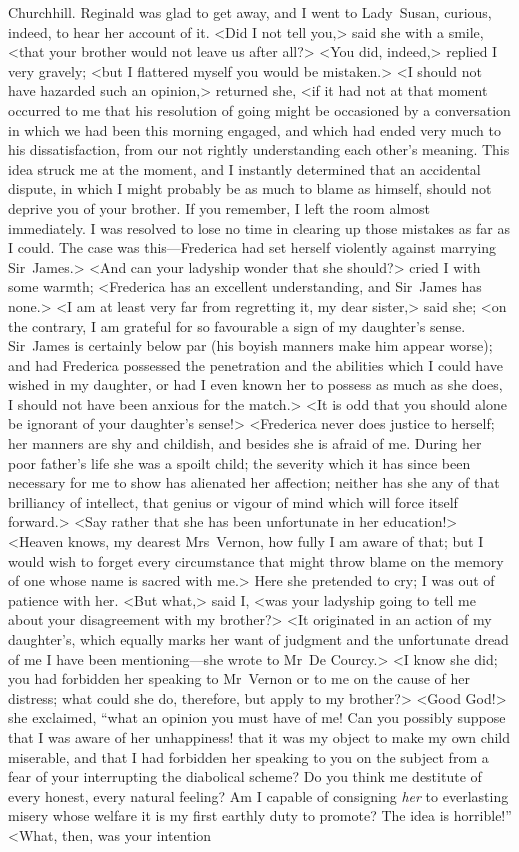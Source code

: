 \begin{mail}{Churchhill.}{}
Reginald was glad to get away, and I went to Lady~Susan, curious, indeed, to hear her account of it. <Did I not tell you,> said she with a smile, <that your brother would not leave us after all?> <You did, indeed,> replied I very gravely; <but I flattered myself you would be mistaken.> <I should not have hazarded such an opinion,> returned she, <if it had not at that moment occurred to me that his resolution of going might be occasioned by a conversation in which we had been this morning engaged, and which had ended very much to his dissatisfaction, from our not rightly understanding each other's meaning. This idea struck me at the moment, and I instantly determined that an accidental dispute, in which I might probably be as much to blame as himself, should not deprive you of your brother. If you remember, I left the room almost immediately. I was resolved to lose no time in clearing up those mistakes as far as I could. The case was this—Frederica had set herself violently against marrying Sir~James.> <And can your ladyship wonder that she should?> cried I with some warmth; <Frederica has an excellent understanding, and Sir~James has none.> <I am at least very far from regretting it, my dear sister,> said she; <on the contrary, I am grateful for so favourable a sign of my daughter's sense. Sir~James is certainly below par (his boyish manners make him appear worse); and had Frederica possessed the penetration and the abilities which I could have wished in my daughter, or had I even known her to possess as much as she does, I should not have been anxious for the match.> <It is odd that you should alone be ignorant of your daughter's sense!> <Frederica never does justice to herself; her manners are shy and childish, and besides she is afraid of me. During her poor father's life she was a spoilt child; the severity which it has since been necessary for me to show has alienated her affection; neither has she any of that brilliancy of intellect, that genius or vigour of mind which will force itself forward.> <Say rather that she has been unfortunate in her education!> <Heaven knows, my dearest Mrs~Vernon, how fully I am aware of that; but I would wish to forget every circumstance that might throw blame on the memory of one whose name is sacred with me.> Here she pretended to cry; I was out of patience with her. <But what,> said I, <was your ladyship going to tell me about your disagreement with my brother?> <It originated in an action of my daughter's, which equally marks her want of judgment and the unfortunate dread of me I have been mentioning—she wrote to Mr~De Courcy.> <I know she did; you had forbidden her speaking to Mr~Vernon or to me on the cause of her distress; what could she do, therefore, but apply to my brother?> <Good God!> she exclaimed, “what an opinion you must have of me! Can you possibly suppose that I was aware of her unhappiness! that it was my object to make my own child miserable, and that I had forbidden her speaking to you on the subject from a fear of your interrupting the diabolical scheme? Do you think me destitute of every honest, every natural feeling? Am I capable of consigning \textit{her} to everlasting misery whose welfare it is my first earthly duty to promote? The idea is horrible!” <What, then, was your intention 
\end{mail}
